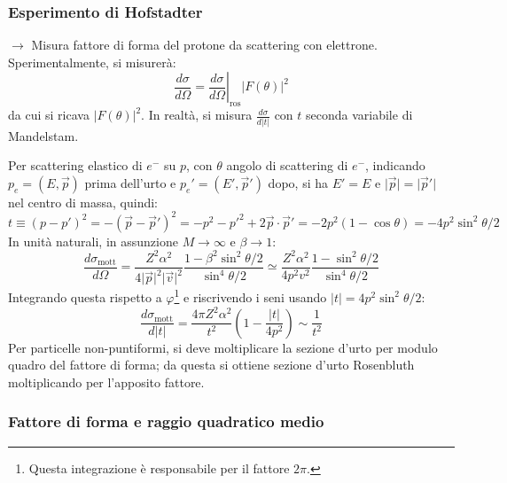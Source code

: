 \documentclass[10pt, a4paper]{scrartcl}
\newcommand*\Eval[3]{\left.#1\right\rvert_{#2}^{#3}}
\numberwithin{equation}{subsection}
\theoremstyle{style1}
\begin{document}
\subsubsection{Esperimento di Hofstadter}

$\to$ Misura fattore di forma del protone da scattering con elettrone. Sperimentalmente, si misurer\`a:
\[
\frac{d \sigma }{d \Omega } =\Eval{\frac{d \sigma }{d \Omega } }{\text{ros}}{} \lvert F(\theta ) \rvert ^2
\] 
da cui si ricava $\lvert F(\theta ) \rvert ^2$. In realt\`a, si misura $\frac{d \sigma }{d \lvert t \rvert } $ con $t$ seconda variabile di Mandelstam. 

Per scattering elastico di $e^-$ su $p$, con $\theta $ angolo di scattering di $e^-$, indicando $p_e = (E ,\vec{p})$ prima dell'urto e $p_e' = (E', \vec{p}')$ dopo, si ha $E ' = E$ e $\lvert \vec{p} \rvert  = \lvert  \vec{p}' \rvert $ nel centro di massa, quindi:
\[
t \equiv (p-p')^2 = - (\vec{p}- \vec{p}')^2 = - p^2 - p'^2 +  2 \vec{p}\cdot \vec{p}' = - 2 p^2 ( 1 - \cos \theta ) = - 4 p^2 \sin^2 \theta / 2
\] 
In unit\`a naturali, in assunzione $M\to \infty$ e $\beta  \to 1$:
\[
\frac{d \sigma _\text{mott}}{d \Omega } = \frac{Z^2 \alpha ^2}{4 \lvert \vec{p} \rvert ^2 \lvert \vec{v} \rvert ^2} \frac{1- \beta ^2 \sin^2 \theta  / 2}{\sin ^4 \theta / 2} \simeq \frac{Z^2 \alpha ^2}{4 p^2 v^2} \frac{1- \sin^2 \theta  / 2}{\sin^4 \theta  / 2}
\] 
Integrando questa rispetto a $\varphi $\footnote{Questa integrazione \`e responsabile per il fattore $2\pi$.} e riscrivendo i seni usando $\lvert t \rvert  = 4 p^2 \sin^2 \theta / 2$:
\[
\frac{d \sigma _\text{mott}}{d \lvert t \rvert } = \frac{4 \pi Z^2 \alpha ^2}{t^2} \left(1 - \frac{\lvert t \rvert }{4p^2}\right)  \sim \frac{1}{t^2}
\] 
Per particelle non-puntiformi, si deve moltiplicare la sezione d'urto per modulo quadro del fattore di forma; da questa si ottiene sezione d'urto Rosenbluth moltiplicando per l'apposito fattore.
\subsubsection{Fattore di forma e raggio quadratico medio}
\end{document}
